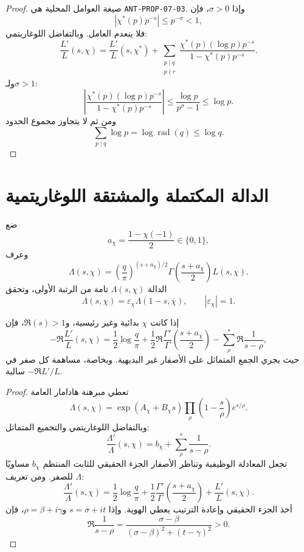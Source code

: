 \begin{proof}
صيغة العوامل المحلية هي
\textenglish{\texttt{ANT-PROP-07-03}}. وإذا \(\sigma>0\)، فإن
\[
|\chi^*(p)p^{-s}|\le p^{-\sigma}<1,
\]
فلا ينعدم العامل. وبالتفاضل اللوغاريتمي:
\[
\frac{L'}{L}(s,\chi)=\frac{L'}{L}(s,\chi^*)+
\sum_{\substack{p\mid q\\p\nmid r}}
\frac{\chi^*(p)(\log p)p^{-s}}
     {1-\chi^*(p)p^{-s}}.
\]
ولـ\(\sigma>1\):
\[
\left|
\frac{\chi^*(p)(\log p)p^{-s}}
     {1-\chi^*(p)p^{-s}}
\right|
\le \frac{\log p}{p^\sigma-1}\le\log p.
\]
ومن ثم لا يتجاوز مجموع الحدود
\[
\sum_{p\mid q}\log p=\log\operatorname{rad}(q)\le\log q.
\]
\end{proof}

\section{الدالة المكتملة والمشتقة اللوغاريتمية}

ضع
\[
a_\chi=\frac{1-\chi(-1)}2\in\{0,1\},
\]
وعرف
\[
\Lambda(s,\chi)=
\left(\frac q\pi\right)^{(s+a_\chi)/2}
\Gamma\!\left(\frac{s+a_\chi}{2}\right)L(s,\chi).
\]
الدالة \(\Lambda(s,\chi)\) تامة من الرتبة الأولى، وتحقق
\[
\Lambda(s,\chi)=\varepsilon_\chi
\Lambda(1-s,\overline\chi),
\qquad |\varepsilon_\chi|=1.
\]

\begin{lemma}
\label{lem:chapter11-log-derivative-zeros}
\provedhere
إذا كانت \(\chi\) بدائية وغير رئيسية، و\(\Re(s)>1\)، فإن
\[
-\Re\frac{L'}{L}(s,\chi)=
\frac12\log\frac q\pi+
\frac12\Re\frac{\Gamma'}{\Gamma}
\!\left(\frac{s+a_\chi}{2}\right)
-
\sum_\rho^*\Re\frac1{s-\rho},
\]
حيث يجري الجمع المتماثل على الأصفار غير البديهية. وبخاصة، مساهمة كل صفر
في \(-\Re L'/L\) سالبة.
\end{lemma}

\begin{proof}
تعطي مبرهنة هادامار العامة
\[
\Lambda(s,\chi)=
\exp(A_\chi+B_\chi s)
\prod_\rho
\left(1-\frac{s}{\rho}\right)e^{s/\rho}.
\]
وبالتفاضل اللوغاريتمي والتجميع المتماثل:
\[
\frac{\Lambda'}{\Lambda}(s,\chi)=
 b_\chi+\sum_\rho^*\frac1{s-\rho}.
\]
تجعل المعادلة الوظيفية وتناظر الأصفار الجزء الحقيقي للثابت المنتظم
\(b_\chi\) مساويًا للصفر. ومن تعريف \(\Lambda\):
\[
\frac{\Lambda'}{\Lambda}(s,\chi)=
\frac12\log\frac q\pi+
\frac12\frac{\Gamma'}{\Gamma}
\!\left(\frac{s+a_\chi}{2}\right)+
\frac{L'}{L}(s,\chi).
\]
أخذ الجزء الحقيقي وإعادة الترتيب يعطي الهوية. وإذا
\(s=\sigma+it\) و\(\rho=\beta+i\gamma\)، فإن
\[
\Re\frac1{s-\rho}=
\frac{\sigma-\beta}
{(\sigma-\beta)^2+(t-\gamma)^2}>0.
\]
\end{proof}


